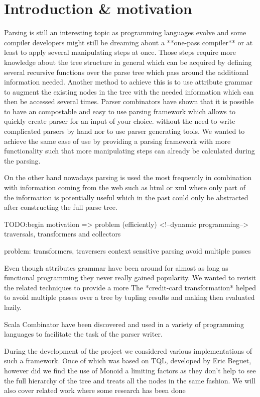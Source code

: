 \section{Introduction \& motivation}
Parsing is still an interesting topic as programming languages evolve and some compiler developers might still be dreaming about a **one-pass compiler** or at least to apply several manipulating steps at once. Those steps require more knowledge about the tree structure in general which can be acquired by defining several recursive functions over the parse tree which pass around the additional information needed. Another method to achieve this is to use attribute grammar to augment the existing nodes in the tree with the needed information which can then be accessed several times.
Parser combinators have shown that it is possible to have an compostable and easy to use parsing framework which allows to quickly create parser for an input of your choice. without the need to write complicated parsers by hand nor to use parser generating tools. We wanted to achieve the same ease of use by providing a parsing framework with more functionality such that more manipulating steps can already be calculated during the parsing.

On the other hand nowadays parsing is used the most frequently in combination with information coming from the web such as html or xml where only part of the information is potentially useful which in the past could only be abstracted after constructing the full parse tree. 

TODO:begin
motivation => problem (efficiently)
<!--dynamic programming-->
traversals, transformers and collectors

problem: 
transformers, traversers
context sensitive parsing
avoid multiple passes

Even though attributes grammar have been around for almost as long as functional programming they never really gained popularity. We wanted to revisit the related techniques to provide a more 
The *credit-card transformation* helped to avoid multiple passes over a tree by tupling results and making then evaluated lazily.

Scala Combinator have been discovered and used in a variety of programming languages to facilitate the task of the parser writer.

During the development of the project we considered various implementations of such a framework. Once of which was based on TQL, developed by Eric Beguet, however did we find the use of Monoid a limiting factors as they don't help to see the full hierarchy of the tree and treats all the nodes in the same fashion.
We will also cover related work where some research has been done 

